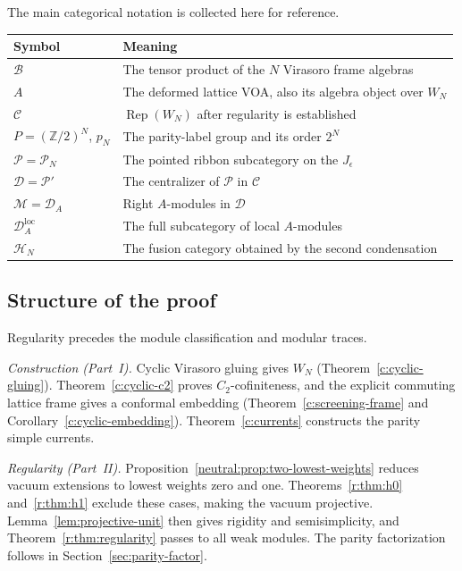\documentclass[11pt,a4paper]{article}
\numberwithin{equation}{section}
\theoremstyle{definition}\newtheorem{definition}[theorem]{Definition}
\theoremstyle{remark}\newtheorem{remark}[theorem]{Remark}
\newcommand{\parityrank}{p_N}
\begin{document}
The main categorical notation is collected here for reference.
\begin{center}\small
\begin{tabular}{@{}ll@{}}
\toprule
Symbol & Meaning\\
\midrule
$\mathcal B$ & The tensor product of the $N$ Virasoro frame algebras\\
$A$ & The deformed lattice VOA, also its algebra object over $W_N$\\
$\mathcal C$ & $\operatorname{Rep}(W_N)$ after regularity is established\\
$P=(\mathbb Z/2)^N$, $\parityrank$ & The parity-label group and its order $2^N$\\
$\mathcal P=\mathcal P_N$ & The pointed ribbon subcategory on the $J_\epsilon$\\
$\mathcal D=\mathcal P'$ & The centralizer of $\mathcal P$ in $\mathcal C$\\
$\mathcal M=\mathcal D_A$ & Right $A$-modules in $\mathcal D$\\
$\mathcal D_A^{\mathrm{loc}}$ & The full subcategory of local $A$-modules\\
$\mathcal H_N$ & The fusion category obtained by the second condensation\\
\bottomrule
\end{tabular}
\end{center}
\subsection{Structure of the proof}
\label{sec:proof-structure}

Regularity precedes the module classification and modular traces.

\emph{Construction (Part~I).}
Cyclic Virasoro gluing gives $W_N$ (Theorem~\ref{c:cyclic-gluing}).
Theorem~\ref{c:cyclic-c2} proves $C_2$-cofiniteness, and the explicit
commuting lattice frame gives a conformal embedding
(Theorem~\ref{c:screening-frame} and Corollary~\ref{c:cyclic-embedding}).
Theorem~\ref{c:currents} constructs the parity simple currents.

\emph{Regularity (Part~II).}
Proposition~\ref{neutral:prop:two-lowest-weights} reduces vacuum
extensions to lowest weights zero and one.
Theorems~\ref{r:thm:h0} and~\ref{r:thm:h1} exclude these cases,
making the vacuum projective. Lemma~\ref{lem:projective-unit} then
gives rigidity and semisimplicity, and
Theorem~\ref{r:thm:regularity} passes to all weak modules.
The parity factorization follows in Section~\ref{sec:parity-factor}.
\end{document}
